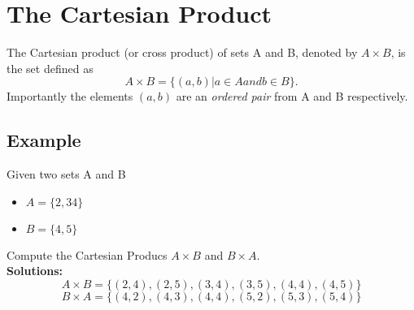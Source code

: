 \documentclass[]{article}
\begin{document}
\section*{The Cartesian Product}
The Cartesian product (or cross product) of sets A and B, denoted by
$A \times B$, is the set defined as
\[A \times  B = \{(a, b) | a \in A and b \in B\}.\]
Importantly the elements $(a, b)$ are an \textit{ordered pair} from A and B respectively.
\subsection*{Example}
Given two sets A and B
\begin{itemize}
\item $A = \{2, 3 4\}$
\item $B = \{4, 5\}$
\end{itemize}
Compute the Cartesian Producs $A\times B$ and $B \times A$.\\
\textbf{Solutions:}
\[ A\times B = \{(2, 4),(2, 5),(3, 4),(3, 5),(4, 4),(4, 5)\}\]
\[ B\times A = \{(4, 2),(4, 3),(4, 4),(5, 2),(5, 3),(5, 4)\}\]
\end{document}
